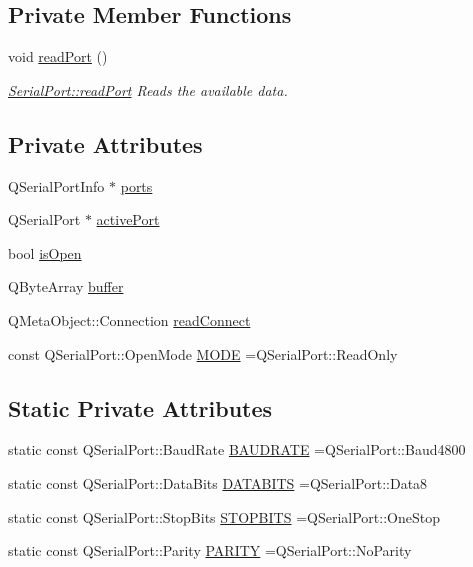 \subsection*{Private Member Functions}
\begin{DoxyCompactItemize}
\item 
void \hyperlink{class_serial_port_a708a04f46660c9803112fda4f60defe1}{read\-Port} ()
\begin{DoxyCompactList}\small\item\em \hyperlink{class_serial_port_a708a04f46660c9803112fda4f60defe1}{Serial\-Port\-::read\-Port} Reads the available data. \end{DoxyCompactList}\end{DoxyCompactItemize}
\subsection*{Private Attributes}
\begin{DoxyCompactItemize}
\item 
Q\-Serial\-Port\-Info $\ast$ \hyperlink{class_serial_port_aead0028dd7ba1073c5a0cf6f1775106b}{ports}
\item 
Q\-Serial\-Port $\ast$ \hyperlink{class_serial_port_abf454cb55d0053b354080a0dd6a43800}{active\-Port}
\item 
bool \hyperlink{class_serial_port_ab4a0ae7dd5d94991088247289935424d}{is\-Open}
\item 
Q\-Byte\-Array \hyperlink{class_serial_port_af5ff5c504f070840bd28ee371f353f05}{buffer}
\item 
Q\-Meta\-Object\-::\-Connection \hyperlink{class_serial_port_a63896cd014af7968402b8e7f051f24b3}{read\-Connect}
\item 
const Q\-Serial\-Port\-::\-Open\-Mode \hyperlink{class_serial_port_a92c94e506ac3ae86ea1e787c0d7b138f}{M\-O\-D\-E} =Q\-Serial\-Port\-::\-Read\-Only
\end{DoxyCompactItemize}
\subsection*{Static Private Attributes}
\begin{DoxyCompactItemize}
\item 
static const Q\-Serial\-Port\-::\-Baud\-Rate \hyperlink{class_serial_port_af5e3812b185f5f72c3ac1c298497694b}{B\-A\-U\-D\-R\-A\-T\-E} =Q\-Serial\-Port\-::\-Baud4800
\item 
static const Q\-Serial\-Port\-::\-Data\-Bits \hyperlink{class_serial_port_a74455f210ee1c4704daf3347b7d2b088}{D\-A\-T\-A\-B\-I\-T\-S} =Q\-Serial\-Port\-::\-Data8
\item 
static const Q\-Serial\-Port\-::\-Stop\-Bits \hyperlink{class_serial_port_a52f45df73cda27a0c096ddbfa53ff025}{S\-T\-O\-P\-B\-I\-T\-S} =Q\-Serial\-Port\-::\-One\-Stop
\item 
static const Q\-Serial\-Port\-::\-Parity \hyperlink{class_serial_port_afb8f52adfc0898451eb78eb5961b125c}{P\-A\-R\-I\-T\-Y} =Q\-Serial\-Port\-::\-No\-Parity
\end{DoxyCompactItemize}


